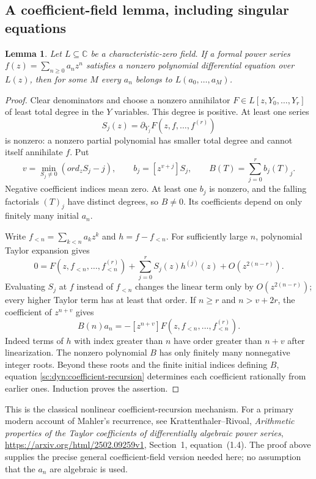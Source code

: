 \documentclass[11pt,a4paper]{article}
\newtheorem{lemma}[theorem]{Lemma}
\theoremstyle{definition}
\theoremstyle{remark}
\theoremstyle{plain}
\numberwithin{equation}{section}
\def\operatorname#1{#1}\def\mathrm#1{#1}}
\begin{document}
\subsection{A coefficient-field lemma, including singular equations}
\begin{lemma}\label{sc:dyn:finite-field}
Let $L\subseteq\mathbb C$ be a characteristic-zero field. If a formal
power series $f(z)=\sum_{n\ge0}a_nz^n$ satisfies a nonzero polynomial
differential equation over $L(z)$, then for some $M$ every $a_n$ belongs
to $L(a_0,\ldots,a_M)$.
\end{lemma}
\begin{proof}
Clear denominators and choose a nonzero annihilator
$F\in L[z,Y_0,\ldots,Y_r]$ of least total degree in the $Y$ variables.
This degree is positive. At least one series
\[
 S_j(z)=\partial_{Y_j}F(z,f,\ldots,f^{(r)})
\]
is nonzero: a nonzero partial polynomial has smaller total degree and
cannot itself annihilate $f$. Put
\[
 v=\min_{S_j\ne0}(\operatorname{ord}_zS_j-j),\qquad
 b_j=[z^{v+j}]S_j,\qquad B(T)=\sum_{j=0}^r b_j(T)_j.
\]
Negative coefficient indices mean zero. At least one $b_j$ is nonzero,
and the falling factorials $(T)_j$ have distinct degrees, so $B\ne0$.
Its coefficients depend on only finitely many initial $a_n$.

Write $f_{<n}=\sum_{k<n}a_kz^k$ and $h=f-f_{<n}$. For sufficiently
large $n$, polynomial Taylor expansion gives
\[
 0=F(z,f_{<n},\ldots,f_{<n}^{(r)})
   +\sum_{j=0}^r S_j(z)h^{(j)}(z)+O(z^{2(n-r)}).
\]
Evaluating $S_j$ at $f$ instead of $f_{<n}$ changes the linear term
only by $O(z^{2(n-r)})$; every higher Taylor term has at least that
order. If $n\ge r$ and $n>v+2r$, the coefficient of $z^{n+v}$ gives
\begin{equation}\label{sc:dyn:coefficient-recursion}
 B(n)a_n=-[z^{n+v}]F(z,f_{<n},\ldots,f_{<n}^{(r)}).
\end{equation}
Indeed terms of $h$ with index greater than $n$ have order greater
than $n+v$ after linearization. The nonzero polynomial $B$ has only
finitely many nonnegative integer roots. Beyond these roots and the
finite initial indices defining $B$, equation
\eqref{sc:dyn:coefficient-recursion} determines each coefficient rationally
from earlier ones. Induction proves the assertion.
\end{proof}
This is the classical nonlinear coefficient-recursion mechanism. For a
primary modern account of Mahler's recurrence, see
Krattenthaler--Rivoal, \emph{Arithmetic properties of the Taylor
coefficients of differentially algebraic power series},
\url{https://arxiv.org/html/2502.09259v1}, Section~1, equation~(1.4).
The proof above supplies the precise general coefficient-field version
needed here; no assumption that the $a_n$ are algebraic is used.
\end{document}

